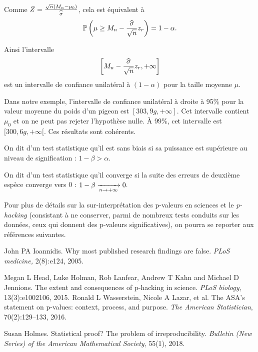 Comme $Z = \frac{\sqrt{n} (M_n - \mu_0)}{{\widehat \sigma}}$, cela est équivalent à 
\[
  \mathbb{P} \left(\mu \geq M_n - \frac{{\widehat \sigma}}{\sqrt{n}} z_r \right) = 1 - \alpha.
\]

Ainsi l'intervalle 
\[
  \left[M_n - \frac{{\widehat \sigma}}{\sqrt{n}} z_r, +\infty \right]
\]
 est un intervalle de confiance unilatéral à $(1-\alpha)$ pour la taille moyenne $\mu$.

 Dans notre exemple, l'intervalle de confiance unilatéral à droite à 95\% pour
 la valeur moyenne du poids d'un pigeon est $[303,9\si{g}, +\infty]$. Cet
 intervalle contient $\mu_0$ et on ne peut pas rejeter l'hypothèse nulle.  À
 99\%, cet intervalle est $[300,6\si{g}, +\infty[.$ Ces résultats sont
 cohérents.

\begin{plusloin}
\item On dit d'un test statistique qu'il est sans biais si sa puissance est
  supérieure au niveau de signification : $1 - \beta > \alpha$.
\item On dit d'un test statistique qu'il converge si la suite des erreurs de
  deuxième espèce converge vers $0$ : $1 - \beta \xrightarrow[n \rightarrow +\infty]{} 0.$ 
\item Pour plus de détails sur la sur-interprétation des p-valeurs en sciences
  et le \textit{p-hacking} (consistant à ne conserver, parmi de nombreux tests
  conduits sur les données, ceux qui donnent des p-valeurs significatives), on
  pourra se reporter aux références suivantes.
  \vspace{-105pt}
  \begin{thebibliography}{99}
    John PA Ioannidis.
    {Why most published research findings are false.}
    \textit{PLoS medicine,} 
    2(8):{e124},
    {2005.}

    Megan L Head, Luke Holman, Rob Lanfear, Andrew T Kahn and Michael D Jennions.
    {The extent and consequences of p-hacking in science.}
    \textit{PLoS biology},
    13(3):{e1002106},
    {2015.}
    Ronald L Wasserstein, Nicole A Lazar, et al.
    {The ASA's statement on p-values: context, process, and purpose}.
    \textit{The American Statistician},
    70(2):129--133,
    2016.

    Susan Holmes.
    {Statistical proof? The problem of irreproducibility}.
    \textit{Bulletin (New Series) of the American Mathematical Society},
    {55}(1), 2018.
  \end{thebibliography}
\end{plusloin}





